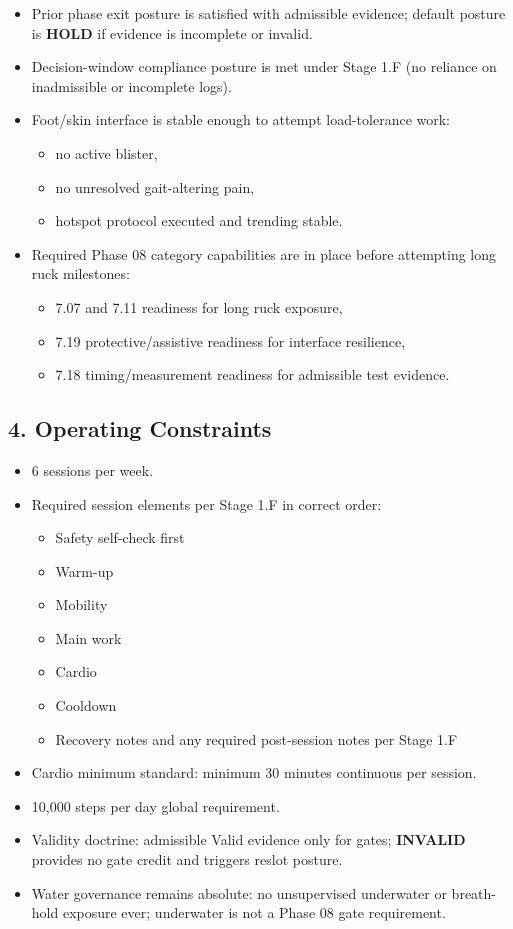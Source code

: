\documentclass[10pt]{article}
\begin{document}
\begin{itemize}
\item Prior phase exit posture is satisfied with admissible evidence; default posture is \textbf{HOLD} if evidence is incomplete or invalid.
\item Decision-window compliance posture is met under Stage 1.F (no reliance on inadmissible or incomplete logs).
\item Foot/skin interface is stable enough to attempt load-tolerance work:
  \begin{itemize}
  \item no active blister,
  \item no unresolved gait-altering pain,
  \item hotspot protocol executed and trending stable.
  \end{itemize}
\item Required Phase 08 category capabilities are in place before attempting long ruck milestones:
  \begin{itemize}
  \item 7.07 and 7.11 readiness for long ruck exposure,
  \item 7.19 protective/assistive readiness for interface resilience,
  \item 7.18 timing/measurement readiness for admissible test evidence.
  \end{itemize}
\end{itemize}

\subsection*{4. Operating Constraints}


\begin{itemize}
\item 6 sessions per week.
\item Required session elements per Stage 1.F in correct order:
  \begin{itemize}
  \item Safety self-check first
  \item Warm-up
  \item Mobility
  \item Main work
  \item Cardio
  \item Cooldown
  \item Recovery notes and any required post-session notes per Stage 1.F
  \end{itemize}
\item Cardio minimum standard: minimum 30 minutes continuous per session.
\item 10,000 steps per day global requirement.
\item Validity doctrine: admissible Valid evidence only for gates; \textbf{INVALID} provides no gate credit and triggers reslot posture.
\item Water governance remains absolute: no unsupervised underwater or breath-hold exposure ever; underwater is not a Phase 08 gate requirement.
\end{itemize}
\end{document}

